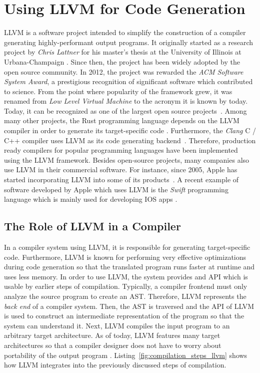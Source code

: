 \section{Using LLVM for Code Generation}

LLVM is a software project intended to simplify the construction of a compiler generating highly-performant output programs.
It originally started as a research project by \emph{Chris Lattner} for his master's thesis at the University of Illinois at Urbana-Champaign \cite{Lattner:MSThesis02}.
Since then, the project has been widely adopted by the open source community.
In 2012, the project was rewarded the \emph{ACM Software System Award}, a prestigious recognition of significant software which contributed to science.
From the point where popularity of the framework grew, it was renamed from \emph{Low Level Virtual Machine} to the acronym it is known by today.
Today, it can be recognized as one of the largest open source projects~\cite[preface]{Cardoso_Lopes2014-jt}.
Among many other projects, the Rust programming language depends on the LLVM compiler in order to generate its target-specific code \cite[p.~373]{McNamara2021-hz}.
Furthermore, the \emph{Clang} C / C++ compiler uses LLVM as its code generating backend~\cite[preface]{Hsu2021-ez}.
Therefore, production ready compilers for popular programming languages have been implemented using the LLVM framework.
Besides open-source projects, many companies also use LLVM in their commercial software.
For instance, since 2005, Apple has started incorporating LLVM into some of its products~\cite[pp.~11-15]{Fandrey}.
A recent example of software developed by Apple which uses LLVM is the \emph{Swift} programming language which is mainly used for developing IOS apps \cite[preface]{Hsu2021-ez}.

\subsection{The Role of LLVM in a Compiler}

In a compiler system using LLVM, it is responsible for generating target-specific code.
Furthermore, LLVM is known for performing very effective optimizations during code generation so that the translated program runs faster at runtime and uses less memory.
In order to use LLVM, the system provides and API which is usable by earlier steps of compilation.
Typically, a compiler frontend must only analyze the source program to create an AST.
Therefore, LLVM represents the \emph{back end} of a compiler system.
Then, the AST is traversed and the API of LLVM is used to construct an intermediate representation of the program so that the system can understand it.
Next, LLVM compiles the input program to an arbitrary target architecture.
As of today, LLVM features many target architectures so that a compiler designer does not have to worry about portability of the output program \cite[preface]{Hsu2021-ez}.
Listing~\ref{fig:compilation_steps_llvm} shows how LLVM integrates into the previously discussed steps of compilation.

